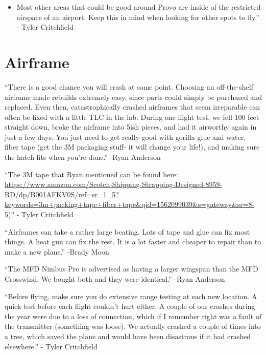 \documentclass[]{auvsi_doc}
\providecommand{\tightlist}{%
  \setlength{\itemsep}{0pt}\setlength{\parskip}{0pt}}
\begin{document}
\begin{itemize}
\tightlist
\item
  {Most other areas that could be good around Provo are inside of the
  restricted airspace of an airport. Keep this in mind when looking for
  other spots to fly.'' - Tyler Critchfield}
\end{itemize}

\section{Airframe}

{``There is a good chance you will crash at some point. Choosing an
off-the-shelf airframe made rebuilds extremely easy, since parts could
simply be purchased and replaced. Even then, catastrophically crashed
airframes that seem irreparable can often be fixed with a little TLC in
the lab. During one flight test, we fell 100 feet straight down, broke
the airframe into 5ish pieces, and had it airworthy again in just a few
days. You just need to get really good with gorilla glue and water,
fiber tape (get the 3M packaging stuff- it will change your life!), and
making sure the hatch fits when you're done.'' -Ryan Anderson}

{}

{``The 3M tape that Ryan mentioned can be found here:
}{\href{https://www.google.com/url?q=https://www.amazon.com/Scotch-Shipping-Strapping-Designed-8959-RD/dp/B001AFKV0S/ref\%3Dsr_1_5?keywords\%3D3m\%2Bpacking\%2Btape\%2Bfiber\%2Btape\%26qid\%3D1562099039\%26s\%3Dgateway\%26sr\%3D8-5\&sa=D\&ust=1564438983448000}{https://www.amazon.com/Scotch-Shipping-Strapping-Designed-8959-RD/dp/B001AFKV0S/ref=sr\_1\_5?keywords=3m+packing+tape+fiber+tape\&qid=1562099039\&s=gateway\&sr=8-5}}{)''
- Tyler Critchfield}

{}

{``Airframes can take a rather large beating. Lots of tape and glue can
fix most things. A heat gun can fix the rest. It is a lot faster and
cheaper to repair than to make a new plane.'' -Brady Moon}

{}

{``The MFD Nimbus Pro is advertised as having a larger wingspan than the
MFD Crosswind. We bought both and they were identical.'' -Ryan Anderson}

{}

{``Before flying, make sure you do extensive range testing at each new
location. A quick test before each flight couldn't hurt either. A couple
of our crashes during the year were due to a loss of connection, which
if I remember right was a fault of the transmitter (something was
loose). We actually crashed a couple of times into a tree, which saved
the plane and would have been disastrous if it had crashed elsewhere.''
- Tyler Critchfield}
\end{document}
